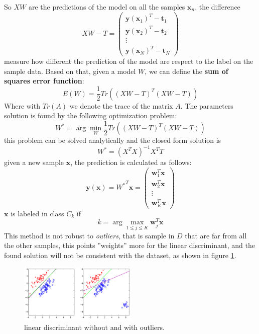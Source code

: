 \documentclass[10pt, letterpaper]{report}
\begin{document}
So $XW$ are the predictions of the model on all the samples $\mathbf x_n$, the difference\begin{equation}
	XW-T = \begin{pmatrix}
		\mathbf y(\mathbf x_1)^T-\mathbf t_1 \\
		\mathbf y(\mathbf x_2)^T-\mathbf t_2 \\
		\vdots                               \\
		\mathbf y(\mathbf x_N)^T-\mathbf t_N
	\end{pmatrix}
\end{equation}
measure how different the prediction of the model are respect to the label on the sample data. Based on that, given a model $W$, we can define the \textbf{sum of squares error function}:\begin{equation}
	E(W)=\frac{1}{2}Tr\left( (XW-T)^T(XW-T) \right)
\end{equation}
Where with $Tr(A)$ we denote the trace of the matrix $A$. The parameters solution is found by the following optimization problem: \begin{equation}
	W^*=\arg\min_W\frac{1}{2}Tr\left( (XW-T)^T(XW-T) \right)
\end{equation}
this problem can be solved analytically and  the closed form solution is\begin{equation}
	W^*=(X^TX)^{-1}X^TT
\end{equation}
given a new sample $\mathbf x$, the prediction is calculated as follows:\begin{equation}
	\mathbf y(\mathbf x)={W^*}^T\mathbf x = \begin{pmatrix}
		\mathbf w_1^T\mathbf x \\
		\mathbf w_2^T\mathbf x \\
		\vdots                 \\
		\mathbf w_K^T\mathbf x
	\end{pmatrix}
\end{equation}
$\mathbf x$ is labeled in class $C_k$ if\begin{equation}
	k=\arg\max_{1\le j\le K}\mathbf w_j^T\mathbf x
\end{equation}
This method is not robust to \textit{outliers}, that is sample in $D$ that are far from all the other samples, this points ''weights'' more for the linear discriminant, and the found solution will not be consistent with the dataset, as shown in figure \ref{fig:outliers}.

\begin{figure}[h!]
	\centering
	\includegraphics[width=0.5\textwidth]{images/outliers.png}
	\caption{linear discriminant without and with outliers.}
	\label{fig:outliers}
\end{figure}
\end{document}
